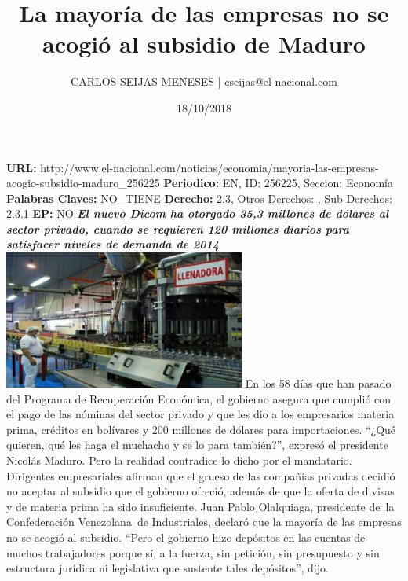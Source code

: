 \documentclass{article}%
\title{\textbf{La mayoría de las empresas no se acogió al subsidio de Maduro}}%
\author{CARLOS SEIJAS MENESES | cseijas@el{-}nacional.com}%
\date{18/10/2018}%
\begin{document}
%
\normalsize%
\maketitle%
\textbf{URL: }%
http://www.el{-}nacional.com/noticias/economia/mayoria{-}las{-}empresas{-}acogio{-}subsidio{-}maduro\_256225\newline%
%
\textbf{Periodico: }%
EN, %
ID: %
256225, %
Seccion: %
Economía\newline%
%
\textbf{Palabras Claves: }%
NO\_TIENE\newline%
%
\textbf{Derecho: }%
2.3, %
Otros Derechos: %
, %
Sub Derechos: %
2.3.1\newline%
%
\textbf{EP: }%
NO\newline%
\newline%
%
\textbf{\textit{El nuevo Dicom ha otorgado 35,3 millones de dólares al sector privado, cuando se requieren 120 millones diarios para satisfacer niveles de demanda de 2014}}%
\newline%
\newline%
%
\includegraphics[width=300px]{155.jpg}%
\newline%
%
En los 58 días que han pasado del Programa de Recuperación Económica, el gobierno asegura que cumplió con el pago de las nóminas del sector privado y que les dio a los empresarios materia prima, créditos en bolívares y 200 millones de dólares para importaciones. “¿Qué quieren, qué les haga el muchacho y se lo para también?”, expresó el presidente Nicolás Maduro.%
\newline%
%
Pero la realidad contradice lo dicho por el mandatario. Dirigentes empresariales afirman que el grueso de las compañías privadas decidió no aceptar al subsidio que el gobierno ofreció, además de que la oferta de divisas y de materia prima ha sido insuficiente.%
\newline%
%
Juan Pablo Olalquiaga, presidente de~la Confederación Venezolana~de Industriales, declaró que la mayoría de las empresas no se acogió al subsidio. “Pero el gobierno hizo depósitos en las cuentas de muchos trabajadores porque sí, a la fuerza, sin petición, sin presupuesto y sin estructura jurídica ni legislativa que sustente tales depósitos”, dijo.%
\end{document}
